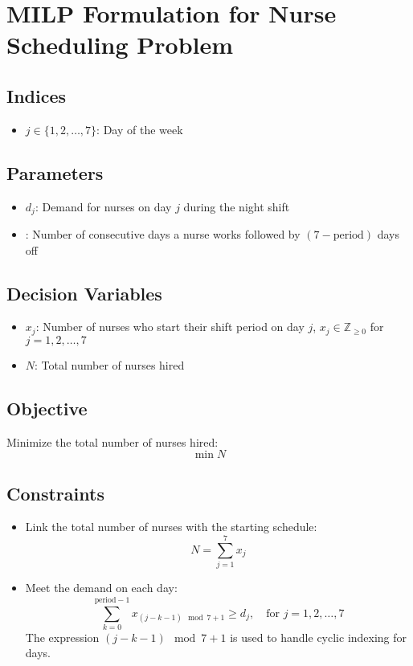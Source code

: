 \documentclass{article}
\begin{document}
\section*{MILP Formulation for Nurse Scheduling Problem}

\subsection*{Indices}
\begin{itemize}
    \item $j \in \{1, 2, \ldots, 7\}$: Day of the week
\end{itemize}

\subsection*{Parameters}
\begin{itemize}
    \item $d_j$: Demand for nurses on day $j$ during the night shift
    \item {}: Number of consecutive days a nurse works followed by $(7 - \text{period})$ days off
\end{itemize}

\subsection*{Decision Variables}
\begin{itemize}
    \item $x_j$: Number of nurses who start their shift period on day $j$, $x_j \in \mathbb{Z}_{\geq 0}$ for $j = 1, 2, \ldots, 7$
    \item $N$: Total number of nurses hired
\end{itemize}

\subsection*{Objective}
Minimize the total number of nurses hired:
\[
\min N
\]

\subsection*{Constraints}
\begin{itemize}
    \item Link the total number of nurses with the starting schedule:
    \[
    N = \sum_{j=1}^{7} x_j
    \]
    \item Meet the demand on each day:
    \[
    \sum_{k=0}^{\text{period} - 1} x_{(j-k-1) \mod 7 + 1} \geq d_j, \quad \text{for } j = 1, 2, \ldots, 7
    \]
    The expression $(j-k-1) \mod 7 + 1$ is used to handle cyclic indexing for days.
\end{itemize}
\end{document}
